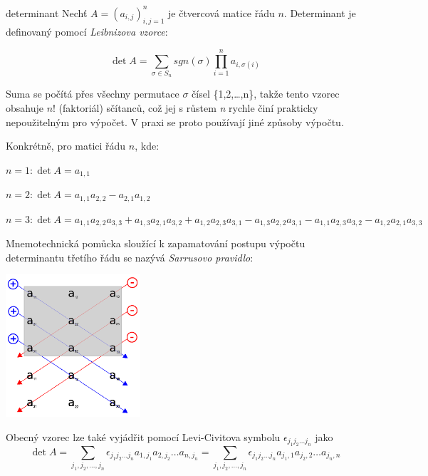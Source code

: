 \begin{definiceN}{determinant}
Nechť $A = (a_{i,j})^{n}_{i,j=1}$ je čtvercová matice řádu $n$.
Determinant je definovaný pomocí \emph{Leibnizova vzorce}:

$$\det A = \sum_{\sigma \in S_n}sgn(\sigma) \prod_{i=1}^n a_{i,\sigma(i)}$$
\end{definiceN}

\begin{poznamka}
Suma se počítá přes všechny permutace $\sigma$ čísel \{1,2,\dots,n\}, takže tento vzorec obsahuje $n!$ (faktoriál) sčítanců, což jej s růstem \emph{n} rychle činí prakticky nepoužitelným pro výpočet. V praxi se proto používají jiné způsoby výpočtu.
\end{poznamka}

\begin{poznamka}
Konkrétně, pro matici řádu $n$, kde:
\begin{pitemize}
\item $n=1: \det A = a_{1,1}$
\item $n=2: \det A = a_{1,1} a_{2,2} - a_{2,1} a_{1,2}$
\item $n=3: \det A = a_{1,1} a_{2,2} a_{3,3} + a_{1,3} a_{2,1} a_{3,2} + a_{1,2} a_{2,3} a_{3,1} - a_{1,3} a_{2,2} a_{3,1} - a_{1,1} a_{2,3} a_{3,2} - a_{1,2} a_{2,1} a_{3,3}$
\end{pitemize}

Mnemotechnická pomůcka sloužící k zapamatování postupu výpočtu determinantu třetího řádu se nazývá \emph{Sarrusovo pravidlo}:
\begin{center} \includegraphics[width=5cm]{matematika/obrazky/sarrusovo_pravidlo.png} \end{center}
\end{poznamka}

\begin{poznamka}
Obecný vzorec lze také vyjádřit pomocí Levi-Civitova symbolu $\epsilon_{{j_1}{j_2}\dots{j_n}}$ jako
$$\det A = \sum_{{j_1},{j_2}, \dots ,{j_n}}\epsilon_{{j_1}{j_2} \dots {j_n}} a_{1,j_1}a_{2,j_2}  \dots  a_{n,j_n} = \sum_{{j_1},{j_2}, \dots ,{j_n}}\epsilon_{{j_1}{j_2} \dots {j_n}} a_{j_1,1}a_{j_2,2}  \dots  a_{j_n,n}$$
\end{poznamka}

